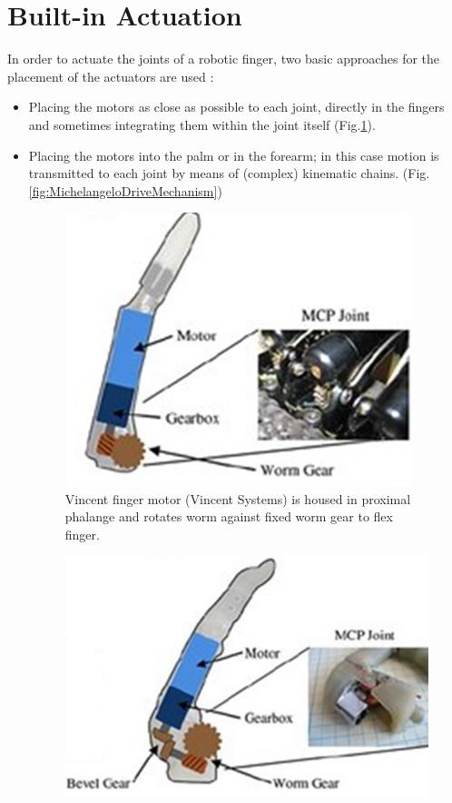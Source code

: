 \documentclass[a4paper, 10pt, conference]{ieeeconf}      %
\begin{document}
\section{\textbf{Built-in Actuation}}
In order to actuate the joints of a robotic finger, two basic approaches for the placement of the actuators are used \cite{belter2013mechanical}:\\
\begin{itemize}
	\item Placing the motors as close as possible to each joint, directly in the fingers and sometimes integrating them within the joint itself (Fig.\ref{fig:VincentFinger}).
	\item Placing the motors into the palm or in the forearm; in this case motion is transmitted to each joint by means of (complex) kinematic chains. (Fig.\ref{fig:MichelangeloDriveMechanism})\\
\begin{figure}[h!]
\centering  \includegraphics[scale=0.6]{./images/VincentFinger}
  \caption{Vincent finger motor (Vincent Systems) is housed in proximal phalange and rotates worm against fixed worm gear to flex finger.}
  \label{fig:VincentFinger}
	\end{figure}
\begin{figure}[h!]
\centering  \includegraphics[scale=0.6]{./images/iLimbFinger}

\end{figure}
\end{itemize}
\end{document}
